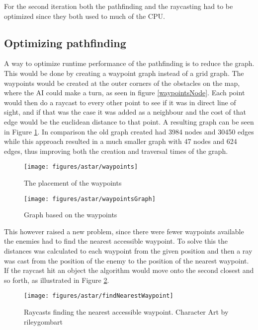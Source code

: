For the second iteration both the pathfinding and the raycasting had to be optimized since they both used to much of the CPU.

\subsection*{Optimizing pathfinding}
A way to optimize runtime performance of the pathfinding is to reduce the graph.
This would be done by creating a waypoint graph instead of a grid graph.
The waypoints would be created at the outer corners of the obstacles on the map, where the AI could make a turn, as seen in figure \ref{waypointsNode}.
Each point would then do a raycast to every other point to see if it was in direct line of sight, and if that was the case it was added as a neighbour and the cost of that edge would be the euclidean distance to that point.
A resulting graph can be seen in Figure \ref{waypointgraph}.
In comparison the old graph created had 3984 nodes and 30450 edges while this approach resulted in a much smaller graph with 47 nodes and 624 edges, thus improving both the creation and traversal times of the graph.

\begin{figure}[H]
\centering
\begin{minipage}{.5\textwidth}
\centering
	\texttt{[image: figures/astar/waypoints]}
	\caption{The placement of the waypoints}
	\label{waypointsNode}
	\end{minipage}%
\begin{minipage}{.5\textwidth}
\centering
	\texttt{[image: figures/astar/waypointsGraph]}
	\caption{Graph based on the waypoints}
	\label{waypointgraph}
	\end{minipage}
\end{figure}

This however raised a new problem, since there were fewer waypoints available the enemies had to find the nearest accessible waypoint.
To solve this the distances was calculated to each waypoint from the given position and then a ray was cast from the position of the enemy to the position of the nearest waypoint.
If the raycast hit an object the algorithm would move onto the second closest and so forth, as illustrated in Figure \ref{nearestWaypoint}.
\begin{figure}[H]
\begin{center}

	\texttt{[image: figures/astar/findNearestWaypoint]}
	\caption{Raycasts finding the nearest accessible waypoint. Character Art by rileygombart\cite{artist}}
	\label{nearestWaypoint}
	
\end{center}
\end{figure}

